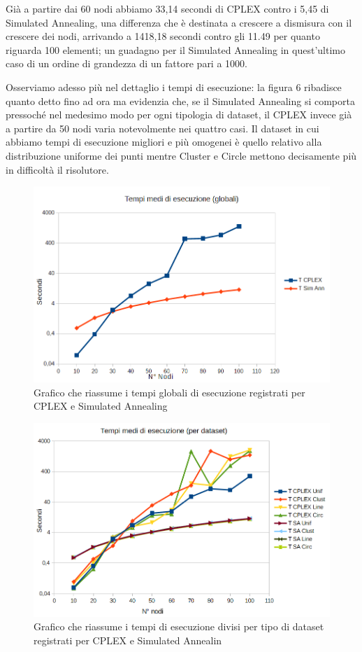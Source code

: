 \documentclass[preprint,12pt]{elsarticle}
\begin{document}
Già a partire dai 60 nodi abbiamo 33,14 secondi di CPLEX contro i 5,45 di Simulated Annealing, una differenza che è destinata a crescere a dismisura con il crescere dei nodi, arrivando a 1418,18 secondi contro gli 11.49 per quanto riguarda 100 elementi; un guadagno per il Simulated Annealing in quest'ultimo caso di un ordine di grandezza di un fattore pari a 1000.

Osserviamo adesso più nel dettaglio i tempi di esecuzione: la figura 6 ribadisce quanto detto fino ad ora ma evidenzia che, se il Simulated Annealing si comporta pressoché nel medesimo modo per ogni tipologia di dataset, il CPLEX invece già a partire da 50 nodi varia notevolmente nei quattro casi. Il dataset in cui abbiamo tempi di esecuzione migliori e più omogenei è quello relativo alla distribuzione uniforme dei punti mentre Cluster e Circle mettono decisamente più in difficoltà il risolutore. \\


\begin{figure}[htbp]
\centering
\includegraphics[scale=0.50]{grafici_confronti/tempi_glob_esec.png} 
\caption{Grafico che riassume i tempi globali di esecuzione registrati per CPLEX e Simulated Annealing}\label{fig:5}
\end{figure}

\begin{figure}[htbp]
\centering
\includegraphics[scale=0.50]{grafici_confronti/tempi_di_esecuzione.png} 
\caption{Grafico che riassume i tempi di esecuzione divisi per tipo di dataset registrati per CPLEX e Simulated Annealin}\label{fig:6}
\end{figure}
\end{document}
